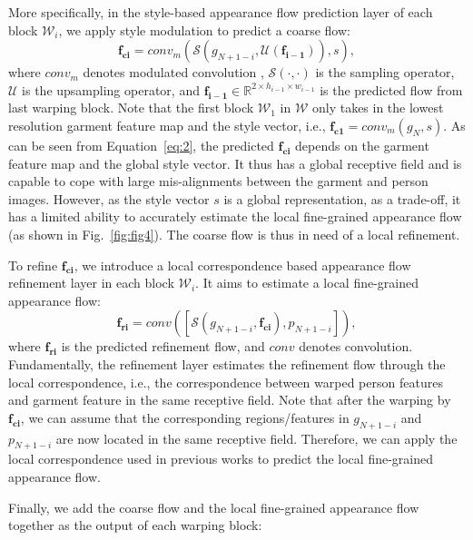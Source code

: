 \documentclass[10pt,twocolumn,letterpaper]{article}
\begin{document}
More specifically, in the style-based appearance flow prediction layer of each block $\mathcal{W}_{i}$, we apply style modulation to predict a coarse flow:
\begin{equation}\label{eq:2}
    \mathbf{f_{ci}} = conv_m(\mathcal{S}(g_{N+1-i}, \mathcal{U}(\mathbf{f_{i-1}})),s),
\end{equation}
where $conv_{m}$ denotes modulated convolution \cite{karras2019style}, $\mathcal{S}(\cdot,\cdot)$ is the sampling operator, $\mathcal{U}$ is the upsampling operator, and $\mathbf{f_{i-1}} \in \mathbb{R}^{2 \times h_{i-1} \times w_{i-1}}$ is the predicted flow from last warping block. Note that the first block $\mathcal{W}_{1}$ in $\mathcal{W}$ only takes in the lowest resolution garment feature map and the style vector, i.e., $\mathbf{f_{c1}} = conv_{m}(g_{N}, s)$. As can be seen from Equation~\ref{eq:2}, the predicted $\mathbf{f_{ci}}$ depends on the garment feature map and the global style vector. It thus has a global receptive field and is capable to cope with large mis-alignments between the garment and  person images. However, as the style vector $s$ is a global representation, as a trade-off, it has a limited ability to accurately estimate the local fine-grained appearance flow (as shown in Fig.~\ref{fig:fig4}). The coarse flow is thus in need of a local refinement.

To refine $\mathbf{f_{ci}}$, we introduce a local correspondence based appearance flow refinement layer in  each block $\mathcal{W}_{i}$. It aims to estimate a local fine-grained appearance flow: 
\begin{equation}\label{eq:3}
    \mathbf{f_{ri}} = conv([\mathcal{S}(g_{N+1-i}, \mathbf{f_{ci}}),p_{N+1-i}]),
\end{equation}
where $\mathbf{f_{ri}}$ is the predicted refinement flow, and $conv$ denotes convolution. Fundamentally, the refinement layer estimates the refinement flow through the local correspondence, i.e., the correspondence between warped person features and garment feature in the same receptive field. Note that after the warping by $\mathbf{f_{ci}}$, we can assume that the corresponding regions/features in $g_{N+1-i}$ and $p_{N+1-i}$ are now located in the same receptive field. Therefore, we can apply the local correspondence used in previous works \cite{han2019clothflow,ge2021parser} to predict the local fine-grained appearance flow.

Finally, we add the coarse flow and the local fine-grained appearance flow together as the output of each warping block:
\end{document}
